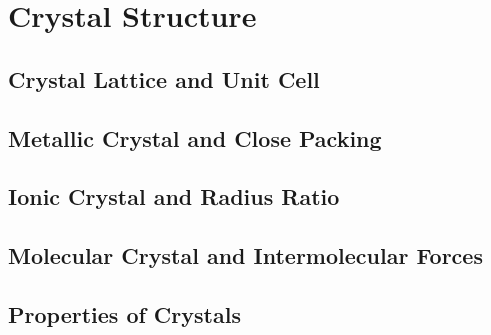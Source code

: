\section{Crystal Structure}
\subsection{Crystal Lattice and Unit Cell}
\subsection{Metallic Crystal and Close Packing}
\subsection{Ionic Crystal and Radius Ratio}
\subsection{Molecular Crystal and Intermolecular Forces}
\subsection{Properties of Crystals}

\newpage
